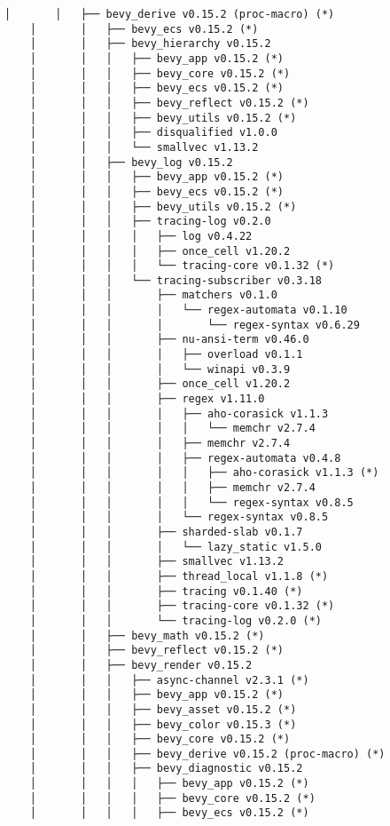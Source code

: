 \begin{lstlisting}[style=mystyle, caption={dependencias del proyecto}, label={lst:dependencias}]
    │       │   ├── bevy_derive v0.15.2 (proc-macro) (*)
    │       │   ├── bevy_ecs v0.15.2 (*)
    │       │   ├── bevy_hierarchy v0.15.2
    │       │   │   ├── bevy_app v0.15.2 (*)
    │       │   │   ├── bevy_core v0.15.2 (*)
    │       │   │   ├── bevy_ecs v0.15.2 (*)
    │       │   │   ├── bevy_reflect v0.15.2 (*)
    │       │   │   ├── bevy_utils v0.15.2 (*)
    │       │   │   ├── disqualified v1.0.0
    │       │   │   └── smallvec v1.13.2
    │       │   ├── bevy_log v0.15.2
    │       │   │   ├── bevy_app v0.15.2 (*)
    │       │   │   ├── bevy_ecs v0.15.2 (*)
    │       │   │   ├── bevy_utils v0.15.2 (*)
    │       │   │   ├── tracing-log v0.2.0
    │       │   │   │   ├── log v0.4.22
    │       │   │   │   ├── once_cell v1.20.2
    │       │   │   │   └── tracing-core v0.1.32 (*)
    │       │   │   └── tracing-subscriber v0.3.18
    │       │   │       ├── matchers v0.1.0
    │       │   │       │   └── regex-automata v0.1.10
    │       │   │       │       └── regex-syntax v0.6.29
    │       │   │       ├── nu-ansi-term v0.46.0
    │       │   │       │   ├── overload v0.1.1
    │       │   │       │   └── winapi v0.3.9
    │       │   │       ├── once_cell v1.20.2
    │       │   │       ├── regex v1.11.0
    │       │   │       │   ├── aho-corasick v1.1.3
    │       │   │       │   │   └── memchr v2.7.4
    │       │   │       │   ├── memchr v2.7.4
    │       │   │       │   ├── regex-automata v0.4.8
    │       │   │       │   │   ├── aho-corasick v1.1.3 (*)
    │       │   │       │   │   ├── memchr v2.7.4
    │       │   │       │   │   └── regex-syntax v0.8.5
    │       │   │       │   └── regex-syntax v0.8.5
    │       │   │       ├── sharded-slab v0.1.7
    │       │   │       │   └── lazy_static v1.5.0
    │       │   │       ├── smallvec v1.13.2
    │       │   │       ├── thread_local v1.1.8 (*)
    │       │   │       ├── tracing v0.1.40 (*)
    │       │   │       ├── tracing-core v0.1.32 (*)
    │       │   │       └── tracing-log v0.2.0 (*)
    │       │   ├── bevy_math v0.15.2 (*)
    │       │   ├── bevy_reflect v0.15.2 (*)
    │       │   ├── bevy_render v0.15.2
    │       │   │   ├── async-channel v2.3.1 (*)
    │       │   │   ├── bevy_app v0.15.2 (*)
    │       │   │   ├── bevy_asset v0.15.2 (*)
    │       │   │   ├── bevy_color v0.15.3 (*)
    │       │   │   ├── bevy_core v0.15.2 (*)
    │       │   │   ├── bevy_derive v0.15.2 (proc-macro) (*)
    │       │   │   ├── bevy_diagnostic v0.15.2
    │       │   │   │   ├── bevy_app v0.15.2 (*)
    │       │   │   │   ├── bevy_core v0.15.2 (*)
    │       │   │   │   ├── bevy_ecs v0.15.2 (*)

\end{lstlisting}
